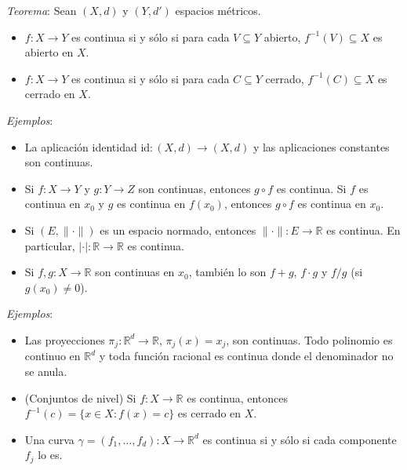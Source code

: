 \documentclass{beamer}
\begin{document}
  \begin{frame}
    \textit{Teorema}: Sean $(X, d)$ y $(Y, d')$ espacios métricos.
    \begin{itemize}[<+->]
      \item $f: X \to Y$ es continua si y sólo si para cada $V \subseteq Y$ abierto, 
      $f^{-1}(V) \subseteq X$ es abierto en $X$.
      \item $f: X \to Y$ es continua si y sólo si para cada $C \subseteq Y$ cerrado, 
      $f^{-1}(C) \subseteq X$ es cerrado en $X$.
    \end{itemize}
  \end{frame}

  \begin{frame}
    \textit{Ejemplos}:
    \begin{itemize}[<+->]
      \item La aplicación identidad $\mathrm{id}: (X, d) \to (X, d)$ y las 
      aplicaciones constantes son continuas.
      \item Si $f: X \to Y$ y $g: Y \to Z$ son continuas, entonces $g \circ f$ es continua. 
      Si $f$ es continua en $x_0$ y $g$ es continua en $f(x_0)$, entonces $g \circ f$ es 
      continua en $x_0$.
      \item Si $(E, \|\cdot\|)$ es un espacio normado, entonces $\|\cdot\|: E \to \mathbb{R}$ 
      es continua. En particular, $|\cdot|: \mathbb{R} \to \mathbb{R}$ es continua.
      \item Si $f, g: X \to \mathbb{R}$ son continuas en $x_0$, también lo son $f + g$, 
      $f \cdot g$ y $f/g$ (si $g(x_0) \neq 0$).
    \end{itemize}
  \end{frame}

  \begin{frame}
    \textit{Ejemplos}:
    \begin{itemize}[<+->]
      \item Las proyecciones $\pi_j: \mathbb{R}^d \to \mathbb{R}$, $\pi_j(x) = x_j$, son 
      continuas. Todo polinomio es continuo en $\mathbb{R}^d$ y toda función racional es 
      continua donde el denominador no se anula.
      \item (Conjuntos de nivel) Si $f: X \to \mathbb{R}$ es continua, entonces 
      $f^{-1}(c) = \{x \in X : f(x) = c\}$ es cerrado en $X$.
      \item Una curva $\gamma = (f_1, \ldots, f_d): X \to \mathbb{R}^d$ es continua si y 
      sólo si cada componente $f_j$ lo es.
    \end{itemize}
  \end{frame}
\end{document}
